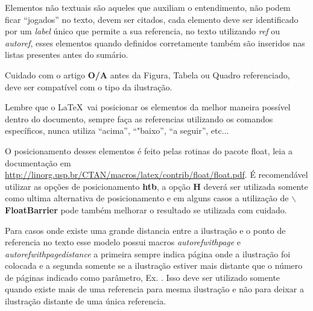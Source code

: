 Elementos não textuais são aqueles que auxiliam o entendimento, não podem ficar \enquote{jogados} no texto, devem ser citados, cada elemento deve ser identificado por um \emph{label} único que permite a sua referencia, no texto utilizando \emph{ref} ou \emph{autoref}, esses elementos quando definidos corretamente também são inseridos nas listas presentes antes do sumário.

Cuidado com o artigo \textbf{O/A} antes da Figura, Tabela ou Quadro referenciado, deve ser compatível com o tipo da ilustração.

Lembre que o \LaTeX \  vai posicionar os elementos  da melhor maneira possível dentro do documento, sempre faça as referencias utilizando os comandos específicos, nunca utiliza \enquote{acima}, \enquote{"baixo}, \enquote{a seguir}, etc... 

O posicionamento desses elementos é feito pelas rotinas do pacote float, leia a documentação em  \url{http://linorg.usp.br/CTAN/macros/latex/contrib/float/float.pdf}. É recomendável utilizar as opções de posicionamento \textbf{htb}, a opção \textbf{H} deverá ser utilizada somente como ultima alternativa de posicionamento e em alguns casos a utilização de \textbf{$\backslash$FloatBarrier} pode também melhorar o resultado se utilizada com cuidado.


Para casos onde existe uma grande distancia entre a ilustração e o ponto de referencia no texto esse modelo possui macros \emph{autorefwithpage} e \emph{autorefwithpagedistance} a primeira sempre indica página onde a ilustração foi colocada e a segunda somente se a ilustração estiver mais distante que o número de páginas indicado como parâmetro, Ex. . Isso deve ser utilizado somente quando existe mais de uma referencia para mesma ilustração e não para deixar a ilustração distante de uma única referencia.











